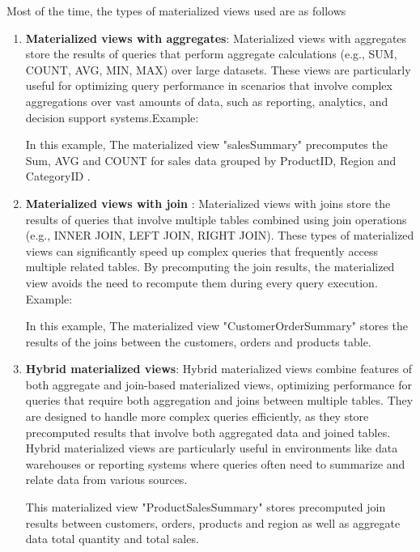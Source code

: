 Most of the time, the types of materialized views used are as follows
\begin{enumerate}[label=\alph*)]
    \item \textbf{Materialized views with aggregates}: Materialized views with aggregates store the results of queries that perform aggregate calculations (e.g., SUM, COUNT, AVG, MIN, MAX) over large datasets. These views are particularly useful for optimizing query performance in scenarios that involve complex aggregations over vast amounts of data, such as reporting, analytics, and decision support systems.Example:
    

    In this example, The materialized view "salesSummary" precomputes the Sum, AVG and COUNT for sales data grouped by ProductID, Region and CategoryID .

    \item \textbf{Materialized views with join }: Materialized views with joins store the results of queries that involve multiple tables combined using join operations (e.g., INNER JOIN, LEFT JOIN, RIGHT JOIN). These types of materialized views can significantly speed up complex queries that frequently access multiple related tables. By precomputing the join results, the materialized view avoids the need to recompute them during every query execution. Example: 
    

    In this example, The materialized view "CustomerOrderSummary"
    stores the results of the joins between the customers, orders and products table.
    \item \textbf{Hybrid materialized views}: Hybrid materialized views combine features of both aggregate and join-based materialized views, optimizing performance for queries that require both aggregation and joins between multiple tables. They are designed to handle more complex queries efficiently, as they store precomputed results that involve both aggregated data and joined tables. Hybrid materialized views are particularly useful in environments like data warehouses or reporting systems where queries often need to summarize and relate data from various sources.
    
This materialized view "ProductSalesSummary" stores precomputed join results between customers, orders, products and region as well as aggregate data total quantity and total sales.
    
\end{enumerate}

